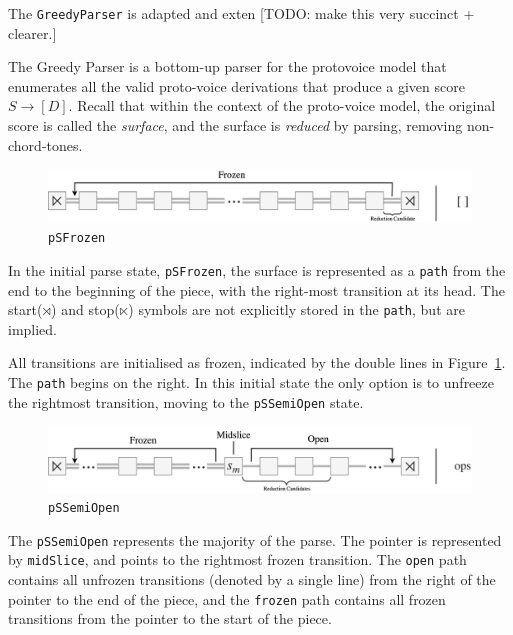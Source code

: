\documentclass[12pt,a4paper,twoside,openany]{report} \usepackage[pdfborder={0 0 0}]{hyperref}    %
\theoremstyle{definition} \newtheorem{definition}{Definition}[section]
\begin{document}
      The \texttt{GreedyParser} is adapted and exten 
      [TODO: make this very succinct + clearer.]

      The Greedy Parser is a bottom-up parser for the protovoice model that enumerates all the valid
      proto-voice
      derivations that produce a given score $S \to [D]$. Recall that within the context of the proto-voice model, the
      original score is called the \textit{surface}, and the surface is \textit{reduced} by parsing, removing
      non-chord-tones. 


      \begin{figure}[ht] \centering\includegraphics[width=\textwidth]{impl/parseState/frozen.png}
      \caption{\texttt{pSFrozen}} \label{fig:pSFrozen} \end{figure}

      In the initial parse state, \texttt{pSFrozen}, the surface is represented as a \texttt{path} from the end to the
      beginning of the piece, with the right-most transition at its head. The start($\rtimes$) and stop($\ltimes$)
      symbols are not explicitly stored in the \texttt{path}, but are implied.

      All transitions are initialised as frozen, indicated by the double lines in Figure~\ref{fig:pSFrozen}. The
      \texttt{path} begins on the right. In this initial state the only option is to unfreeze the rightmost transition,
      moving to the \texttt{pSSemiOpen} state. 

      \begin{figure}[ht] \centering\includegraphics[width=\textwidth]{impl/parseState/semiopen.png}
      \caption{\texttt{pSSemiOpen}} \label{fig:pSSemiOpen} \end{figure}

      The \texttt{pSSemiOpen} represents the majority of the parse. The pointer is represented by \texttt{midSlice}, and
      points to the rightmost frozen transition. The \texttt{open} path contains all unfrozen transitions (denoted by
      a single line) from the right of the pointer to the end of the piece, and the \texttt{frozen} path contains all
      frozen transitions from the pointer to the start of the piece.
\end{document}
